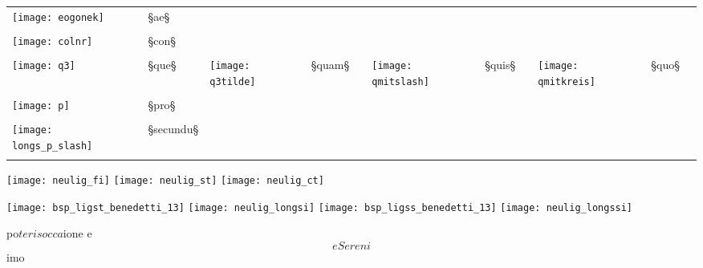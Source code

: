 \begin{liste}
\begin{longtable}[l]{lllllllllll} 
\texttt{[image: eogonek]} & §{ae}§ \\ \\
\texttt{[image: colnr]} & §{con}§ 
\\ \\
\texttt{[image: q3]} & §{que}§ 
&
\texttt{[image: q3tilde]} & §{quam}§ 
&&
\texttt{[image: qmitslash]} & §{quis}§ 
&&
\texttt{[image: qmitkreis]} & §{quo}§ 
\\ \\
\texttt{[image: p]} & §{pro}§ 
\\ \\
\texttt{[image: longs\_p\_slash]} & §{secundu}§ 
\\ \\
\end{longtable}
\end{liste}

\begin{example}

\texttt{[image: neulig\_fi]} \quad
\texttt{[image: neulig\_st]} \quad
\texttt{[image: neulig\_ct]}

\vspace{-3mm}

\texttt{[image: bsp\_ligst\_benedetti\_13]} \quad
\texttt{[image: neulig\_longsi]} \quad
\texttt{[image: bsp\_ligss\_benedetti\_13]} \quad
\texttt{[image: neulig\_longssi]}

\vspace{-3mm}
\begin{typeLatin}
po$teris        occa$ione          e$$e     Sereni$$imo
\end{typeLatin}

\end{example}

